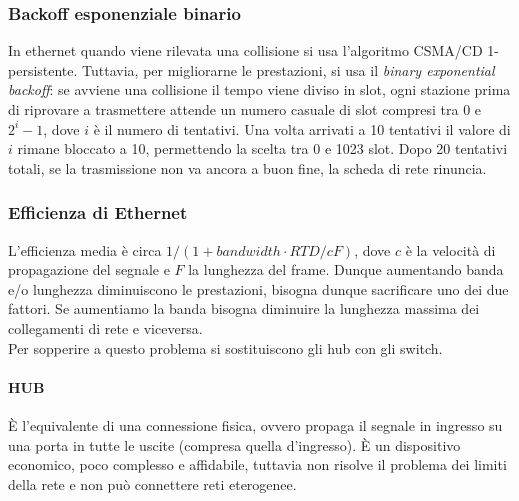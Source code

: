 \documentclass[10pt,a4paper,twoside]{article}
\begin{document}
\subsubsection{Backoff esponenziale binario}
In ethernet quando viene rilevata una collisione si usa l'algoritmo CSMA/CD 1-persistente. Tuttavia, per migliorarne le prestazioni, si usa il \textit{binary exponential backoff}: se avviene una collisione il tempo viene diviso in slot, ogni stazione prima di riprovare a trasmettere attende un numero casuale di slot compresi tra 0 e $2^i-1$, dove $i$ è il numero di tentativi. Una volta arrivati a 10 tentativi il valore di $i$ rimane bloccato a 10, permettendo la scelta tra 0 e 1023 slot. Dopo 20 tentativi totali, se la trasmissione non va ancora a buon fine, la scheda di rete rinuncia.

\subsubsection{Efficienza di Ethernet}
L'efficienza media è circa $1/(1+bandwidth \cdot RTD/cF)$, dove $c$ è la velocità di propagazione del segnale e $F$ la lunghezza del frame. Dunque aumentando banda e/o lunghezza diminuiscono le prestazioni, bisogna dunque sacrificare uno dei due fattori. Se aumentiamo la banda bisogna diminuire la lunghezza massima dei collegamenti di rete e viceversa.\\
Per sopperire a questo problema si sostituiscono gli hub con gli switch.
\paragraph{HUB} È l'equivalente di una connessione fisica, ovvero propaga il segnale in ingresso su una porta in tutte le uscite (compresa quella d'ingresso). È un dispositivo economico, poco complesso e affidabile, tuttavia non risolve il problema dei limiti della rete e non può connettere reti eterogenee.
\end{document}
